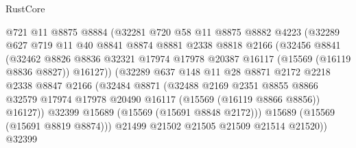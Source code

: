 \begin{lexlean}{RustCore}
\begin{coremodule}
                        @721
                        @11
                        @8875
                        @8884
                        (@32281
                          @720
                          @58
                          @11
                          @8875
                          @8882
                          @4223
                          (@32289
                            @627
                            @719
                            @11
                            @40
                            @8841
                            @8874
                            @8881
                            @2338
                            @8818
                            @2166
                            (@32456
                              @8841
                              (@32462
                                @8826
                                @8836
                                @32321
                                @17974
                                @17978
                                @20387
                                @16117
                                (@15569 (@16119 @8836 @8827))
                                @16127))
                            (@32289
                              @637
                              @148
                              @11
                              @28
                              @8871
                              @2172
                              @2218
                              @2338
                              @8847
                              @2166
                              (@32484
                                @8871
                                (@32488
                                  @2169
                                  @2351
                                  @8855
                                  @8866
                                  @32579
                                  @17974
                                  @17978
                                  @20490
                                  @16117
                                  (@15569 (@16119 @8866 @8856))
                                  @16127))
                              @32399
                              @15689
                              (@15569 (@15691 @8848 @2172)))
                            @15689
                            (@15569 (@15691 @8819 @8874)))
                          @21499
                          @21502
                          @21505
                          @21509
                          @21514
                          @21520))
                      @32399

\end{coremodule}
\end{lexlean}
